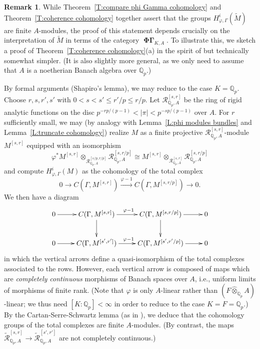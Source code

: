 \documentclass[12pt]{amsart}
\theoremstyle{definition}
\newtheorem{remark}[theorem]{Remark}
\numberwithin{equation}{theorem}
\newcommand{\QQ}{\mathbb{Q}}
\newcommand{\calR}{\mathcal{R}}
\DeclareMathOperator{\PhiGamma}{\mathbf{\Phi \Gamma}}
\begin{document}
\begin{remark}
While Theorem~\ref{T:compare phi Gamma cohomology} and Theorem~\ref{T:coherence cohomology} together assert that the groups $H^i_{\varphi, \Gamma}(\tilde{M})$
are finite $A$-modules,
the proof of this statement depends crucially on the interpretation of $\tilde{M}$ in terms of the category $\PhiGamma_{K,A}$. 
To illustrate this, we sketch a proof of Theorem~\ref{T:coherence cohomology}(a) in the spirit of \cite{kpx} but technically somewhat simpler. (It is also slightly more general,
as we only need to assume that $A$ is a noetherian Banach algebra over $\QQ_p$.)

By formal arguments (Shapiro's lemma), we may reduce to the case $K = \QQ_p$.
Choose $r,s,r',s'$ with $0 < s < s' \leq r'/p \leq r/p$. 
Let $\calR^{[s,r]}_{\QQ_p,A}$ be the ring of rigid analytic functions 
on the disc $p^{-rp/(p-1)} < \left| \pi \right| < p^{-sp/(p-1)}$ over $A$. For $r$ sufficiently small, we may (by analogy with Lemma~\ref{L:phi modules bundles} and Lemma~\ref{L:truncate cohomology}) realize $M$ as a finite projective $\calR^{[s,r]}_{\QQ_p,A}$-module $M^{[s,r]}$
equipped with an isomorphism 
\[
\varphi^* M^{[s,r]} \otimes_{\calR^{[s/p,r/p]}_{\QQ_p,A}} \calR^{[s,r/p]}_{\QQ_p,A} 
\cong M^{[s,r]} \otimes_{\calR^{[s,r]}_{\QQ_p,A}} \calR^{[s,r/p]}_{\QQ_p,A}
\]
and compute $H^i_{\varphi, \Gamma}(M)$ as the cohomology of the total complex
\[
0 \to C(\Gamma, M^{[s,r]}) \stackrel{\varphi-1}{\to} C(\Gamma, M^{[s,r/p]}) \to 0.
\]
We then have a diagram
\[
\xymatrix{
0 \ar[r] & C(\Gamma, M^{[s,r]}) \ar[d] \ar^{\varphi-1}[r] & C(\Gamma, M^{[s,r/p]}) \ar[r] \ar[d] & 0 \\
0 \ar[r] & C(\Gamma, M^{[s',r']}) \ar^{\varphi-1}[r] & C(\Gamma, M^{[s',r'/p]}) \ar[r] & 0
}
\]
in which the vertical arrows define a quasi-isomorphism of the total complexes associated to the rows. However, each vertical arrow is composed of maps which are  \emph{completely continuous} morphisms of Banach spaces over $A$, i.e., uniform limits of morphisms of finite rank. 
(Note that $\varphi$ is only $A$-linear rather than $(F \widehat{\otimes}_{\QQ_p} A)$-linear; we thus need $[K:\QQ_p] < \infty$ in order to reduce to the case $K = F = \QQ_p$.)
By the Cartan-Serre-Schwartz lemma (as in \cite[Satz~2.6]{kiehl-finiteness}), we deduce that the cohomology groups of the total complexes are finite $A$-modules.
(By contrast, the maps $\tilde{\calR}^{[s,r]}_{\QQ_p,A} \to \tilde{\calR}^{[s',r']}_{\QQ_p,A}$ are not completely continuous.)
\end{remark}
\end{document}
